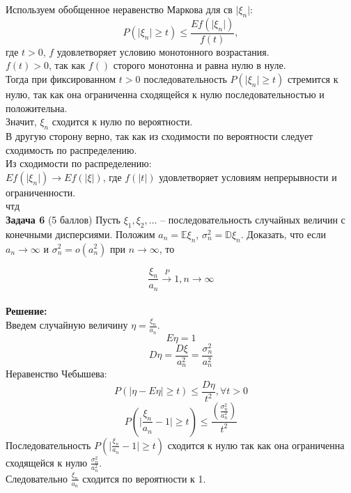 \documentclass{article}
\begin{document}
Используем обобщенное неравенство Маркова для св $\vert\xi_n\vert$:\\
$$P(\vert\xi_n\vert\geq t) \leq \frac{Ef(\vert\xi_n\vert)}{f(t)},$$
где $t>0$, $f$ удовлетворяет условию монотонного возрастания.\\
$f(t) > 0$, так как $f()$ сторого монотонна и равна нулю в нуле.\\
Тогда при фиксированном $t>0$ последовательность $P(\vert\xi_n\vert\geq t)$ стремится к нулю, так как она ограниченна сходящейся к нулю последовательностью и положительна.\\
Значит, $\xi_n$  сходится к нулю по вероятности.\\
В другую сторону верно, так как из сходимости по вероятности следует сходимость по распределению.\\
Из сходимости по распределению:\\
$Ef(\vert\xi_n\vert) \rightarrow Ef(\vert\xi\vert)$, где $f(\vert t\vert)$ удовлетворяет условиям непрерывности и ограниченности.\\
чтд\\

\textbf{Задача 6} (5 баллов)
Пусть $\xi_1, \xi_2, \dots$ -- последовательность случайных величин с конечными дисперсиями. Положим $a_n = \mathbb E \xi_n$, $\sigma_n^2 = \mathbb D\xi_n$. Доказать, что если $a_n \rightarrow \infty$ и $\sigma_n^2 = o(a_n^2)$ при $n \rightarrow \infty$, то 

$$\frac{\xi_n}{a_n} \overset{P}{\rightarrow} 1, n \rightarrow \infty$$\\

\textbf{Решение:}\\
Введем случайную величину $\eta = \frac{\xi_n}{a_n}$.\\
$$E\eta = 1$$
$$D\eta = \frac{D\xi}{a_n^2} = \frac{\sigma^2_n}{a_n^2}$$
Неравенство Чебышева:\\
$$P(\vert\eta - E\eta\vert\geq t) \leq \frac{D\eta}{t^2}, \forall t>0$$
$$P(\vert\frac{\xi_n}{a_n} - 1\vert\geq t) \leq \frac{(\frac{\sigma^2_n}{a_n^2})}{t^2}$$
Последовательность $P(\vert\frac{\xi_n}{a_n} - 1\vert\geq t)$ сходится к нулю так как она ограниченна сходящейся к нулю $\frac{\sigma^2_n}{a_n^2}$.\\
Следовательно $\frac{\xi_n}{a_n}$ сходится по вероятности к 1.
\end{document}

